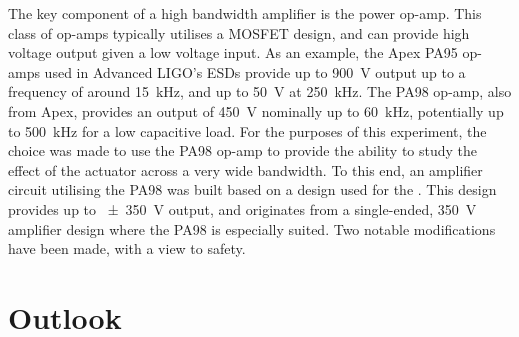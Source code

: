 The key component of a high bandwidth amplifier is the power op-amp. This class of op-amps typically utilises a \gls{MOSFET} design, and can provide high voltage output given a low voltage input. As an example, the Apex PA95 op-amps used in Advanced LIGO's \glspl{ESD} provide up to \SI{900}{\volt} output up to a frequency of around \SI{15}{\kilo\hertz}, and up to \SI{50}{\volt} at \SI{250}{\kilo\hertz}. The PA98 op-amp, also from Apex, provides an output of \SI{450}{\volt} nominally up to \SI{60}{\kilo\hertz}, potentially up to \SI{500}{\kilo\hertz} for a low capacitive load. For the purposes of this experiment, the choice was made to use the PA98 op-amp to provide the ability to study the effect of the actuator across a very wide bandwidth. To this end, an amplifier circuit utilising the PA98 was built based on a design used for the \AEIPROTOTYPE{}. This design provides up to \SI{\pm350}{\volt} output, and originates from a single-ended, \SI{350}{\volt} amplifier design where the PA98 is especially suited. Two notable modifications have been made, with a view to safety.


\section{Outlook}